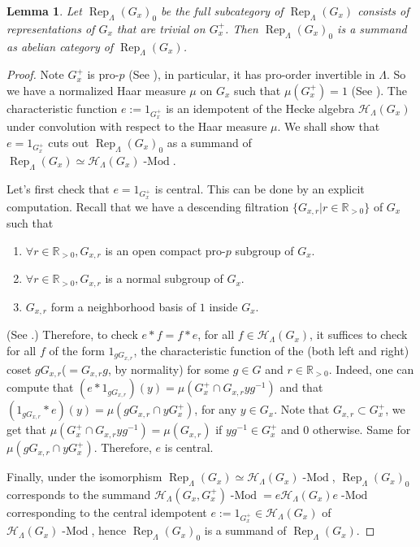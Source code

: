 \documentclass{article}
\newcommand{\red}[1]{\textcolor{red}{#1}}
\newtheorem{lemma}{Lemma}
\newcommand{\Rep}{\operatorname{Rep}}
\newcommand{\Modl}{\operatorname{-Mod}}
\begin{document}
	\begin{lemma}\label{Lem Summand}
		Let $\Rep_{\Lambda}(G_x)_0$ be the full subcategory of $\Rep_{\Lambda}(G_x)$ consists of representations of $G_x$ that are trivial on $G_x^+$. Then $\Rep_{\Lambda}(G_x)_0$ is a summand as abelian category of $\Rep_{\Lambda}(G_x)$.
	\end{lemma}
	
	\begin{proof}
		Note $G_x^+$ is pro-$p$ (See \cite[II.5.2.(b)]{vigneras1996representations}), in particular, it has pro-order invertible in $\Lambda$. So we have a normalized Haar measure $\mu$ on $G_x$ such that $\mu(G_x^+)=1$ (See \cite[I.2.4]{vigneras1996representations}). The characteristic function $e:=1_{G_x^+}$ is an idempotent of the Hecke algebra $\mathcal{H}_{\Lambda}(G_x)$ under convolution with respect to the Haar measure $\mu$. We shall show that $e=1_{G_x^+}$ cuts out $\Rep_{\Lambda}(G_x)_0$ as a summand of $\Rep_{\Lambda}(G_x) \simeq \mathcal{H}_{\Lambda}(G_x)\Modl$.
		
		Let's first check that $e=1_{G_x^+}$ is central. This can be done by an explicit computation. Recall that we have a descending filtration $\{G_{x,r} | r\in \mathbb{R}_{>0}\}$ of $G_x$ such that 
		\begin{enumerate}
			\item $\forall r \in \mathbb{R}_{>0}, G_{x,r}$ is an open compact pro-$p$ subgroup of $G_x$.
			\item $\forall r \in \mathbb{R}_{>0}, G_{x,r}$ is a normal subgroup of $G_x$.
			\item $G_{x,r}$ form a neighborhood basis of $1$ inside $G_x$. 
		\end{enumerate}
		(See \cite[II.5.1]{vigneras1996representations}.) Therefore, to check $e \ast f=f \ast e$, for all $f \in \mathcal{H}_{\Lambda}(G_x)$, it suffices to check for all $f$ of the form $1_{gG_{x,r}}$, the characteristic function of the (both left and right) coset $gG_{x,r}$($=G_{x,r}g$, by normality) for some $g \in G$ and $r \in \mathbb{R}_{>0}$. Indeed, one can compute that $(e \ast 1_{gG_{x,r}})(y)=\mu(G_x^+\cap G_{x,r}yg^{-1})$ and that $(1_{gG_{x,r}} \ast e)(y)=\mu(gG_{x,r}\cap yG_x^+)$, for any $y \in G_x$. Note that $G_{x,r} \subset G_x^+$, we get that $\mu(G_x^+\cap G_{x,r}yg^{-1})=\mu(G_{x,r})$ if $yg^{-1} \in G_x^+$ and $0$ otherwise. Same for $\mu(gG_{x,r}\cap yG_x^+)$. Therefore, $e$ is central.
		
		
		Finally, under the isomorphism $\Rep_{\Lambda}(G_x) \simeq \mathcal{H}_{\Lambda}(G_x)\Modl$, $\Rep_{\Lambda}(G_x)_0$ corresponds to the summand $\mathcal{H}_{\Lambda}(G_x, G_x^+)\Modl=e\mathcal{H}_{\Lambda}(G_x)e\Modl$ corresponding to the central idempotent $e:=1_{G_x^+} \in \mathcal{H}_{\Lambda}(G_x)$ of $\mathcal{H}_{\Lambda}(G_x)\Modl$, hence $\Rep_{\Lambda}(G_x)_0$ is a summand of $\Rep_{\Lambda}(G_x)$. 
	\end{proof}
	
\end{document}
